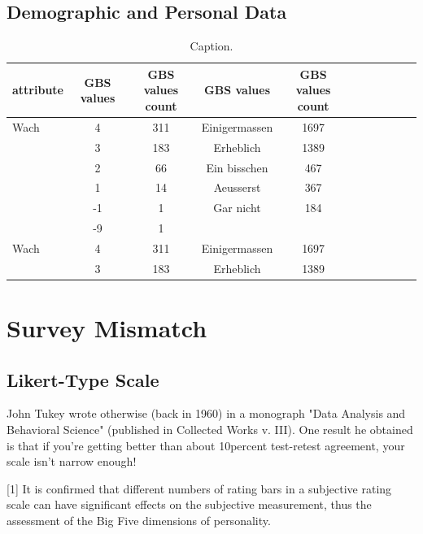 \subsection{Demographic and Personal Data}

\begin{table}[ht]
    \begin{center}
            {\footnotesize
            \begin{tabular}{l|c|ccccccccc}
                \hline \hline
		attribute & GBS values & GBS values count &  GBS values & GBS values count \\
                \hline \hline
                     Wach & 4 & 311 & Einigermassen & 1697 \\
                     & 3 & 183 & Erheblich & 1389 \\
                     & 2 & 66 & Ein bisschen & 467 \\ 
              	& 1 & 14 & Aeusserst & 367 \\	
		& -1 & 1 & Gar nicht & 184 \\		
		& -9 & 1 & & \\
		\hline
		Wach & 4 & 311 & Einigermassen & 1697 \\
                     & 3 & 183 & Erheblich & 1389 \\
            \end{tabular}}
        \caption{Caption.}
\end{center}
\end{table}

\section{Survey Mismatch}

\subsection{Likert-Type Scale}

John Tukey wrote otherwise (back in 1960) in a monograph "Data Analysis and Behavioral Science" (published in Collected Works v. III). One result he obtained is that if you're getting better than about 10percent test-retest agreement, your scale isn't narrow enough!



[1] It is confirmed that different numbers of rating bars in a subjective rating scale can have significant effects on the subjective measurement, thus the assessment of the Big Five dimensions of personality.

